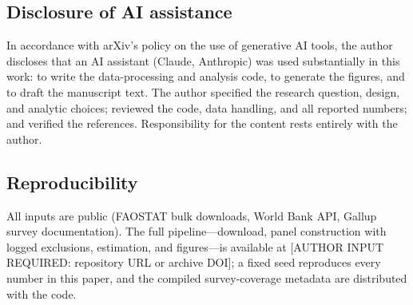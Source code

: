 \documentclass[11pt]{article}
\begin{document}
\subsection*{Disclosure of AI assistance}
In accordance with arXiv's policy on the use of generative AI tools, the author discloses that an AI assistant (Claude, Anthropic) was used substantially in this work: to write the data-processing and analysis code, to generate the figures, and to draft the manuscript text. The author specified the research question, design, and analytic choices; reviewed the code, data handling, and all reported numbers; and verified the references. Responsibility for the content rests entirely with the author.

\subsection*{Reproducibility}
All inputs are public (FAOSTAT bulk downloads, World Bank API, Gallup survey documentation). The full pipeline---download, panel construction with logged exclusions, estimation, and figures---is available at [AUTHOR INPUT REQUIRED: repository URL or archive DOI]; a fixed seed reproduces every number in this paper, and the compiled survey-coverage metadata are distributed with the code.
\end{document}
